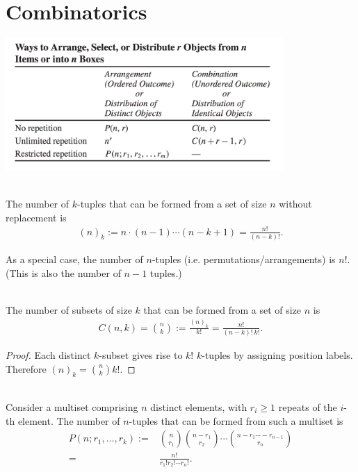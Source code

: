 \section{Combinatorics}

\begin{mdframed}
\includegraphics[width=300pt]{img/discrete-mathematics-tucker-combinatorics-summary.png}
\end{mdframed}

\begin{theorem*}[Subtuples]~\\
  The number of $k$-tuples that can be formed from a set of size $n$ without replacement is
  \begin{align*}
    (n)_k := n \cdot (n-1) \cdots (n - k + 1) = \frac{n!}{(n-k)!}.
  \end{align*}
\end{theorem*}

\begin{remark*}
  As a special case, the number of $n$-tuples (i.e. permutations/arrangements) is $n!$. (This is also
  the number of $n-1$ tuples.)
\end{remark*}

\begin{theorem*}[Subsets]~\\
  The number of subsets of size $k$ that can be formed from a set of size $n$ is
  \begin{align*}
    C(n, k) = {n \choose k} := \frac{(n)_k}{k!} = \frac{n!}{(n-k)!~k!}.
  \end{align*}
\end{theorem*}

\begin{proof}
  Each distinct $k$-subset gives rise to $k!$ $k$-tuples by assigning position labels. Therefore
  $(n)_k = {n \choose k}k!$.
\end{proof}

\begin{theorem*}~\\
  Consider a multiset comprising $n$ distinct elements, with $r_i \geq 1$ repeats of the $i$-th
  element. The number of $n$-tuples that can be formed from such a multiset is
  \begin{align*}
    P(n; r_1, \ldots, r_k)
    :=& {n \choose r_1}{n - r_1 \choose r_2}\cdots{n - r_1 \cdots - r_{n-1} \choose r_n}\\
     =& \frac{n!}{r_1!r_2!\cdots r_n!}.
  \end{align*}
\end{theorem*}

